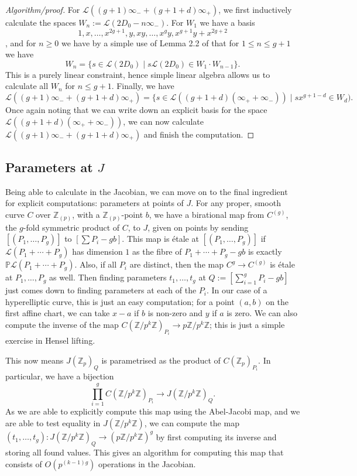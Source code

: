 \documentclass[12pt]{article}
\newcommand{\Z}{\mathbb{Z}}
\newcommand{\Lcal}{\mathcal{L}}
\renewcommand{\P}{\mathbb{P}}
\theoremstyle{plain}
\theoremstyle{definition}
\theoremstyle{remark}
\begin{document}
\begin{proof}[Algorithm/proof]
For $\Lcal((g+1)\infty_- + (g+1+d)\infty_+)$, we first inductively calculate the spaces $W_n := \Lcal(2D_0 - n\infty_-)$. For $W_1$ we have a basis \[1,x,\dots,x^{2g+1},y,xy,\dots,x^g y, x^{g+1}y+x^{2g+2}\], and for $n \geq 0$ we have by a simple use of Lemma 2.2 of \cite{makdisi04} that for $1 \leq n \leq g+1$ we have \[W_{n} = \{s \in \Lcal(2D_0) \mid s\Lcal(2D_0) \in W_1 \cdot W_{n-1}\}.\]
This is a purely linear constraint, hence simple linear algebra allows us to calculate all $W_n$ for $n \leq g+1$. Finally, we have
\[
\Lcal((g+1)\infty_- + (g+1+d)\infty_+) = \{ s \in \Lcal((g+1+d)(\infty_+ + \infty_-)) \mid sx^{g+1-d} \in W_d).
\] 
Once again noting that we can write down an explicit basis for the space $\Lcal((g+1+d)(\infty_+ + \infty_-))$, we can now calculate $\Lcal((g+1)\infty_- + (g+1+d)\infty_+)$ and finish the computation.
\end{proof}

\subsection{Parameters at \texorpdfstring{$J$}{J}}
\label{subs:paramj}
Being able to calculate in the Jacobian, we can move on to the final ingredient for explicit computations: parameters at points of $J$. For any proper, smooth curve $C$ over $\Z_{(p)}$, with a $\Z_{(p)}$-point $b$, we have a birational map from $C^{(g)}$, the $g$-fold symmetric product of $C$, to $J$, given on points by sending $[(P_1,\dots,P_g)]$ to $[\sum P_i - gb]$. This map is \'etale at $[(P_1,\dots,P_g)]$ if $\Lcal(P_1 + \cdots + P_g)$ has dimension $1$ as the fibre of $P_1 + \cdots + P_g -gb$ is exactly $\P \Lcal(P_1 + \cdots + P_g)$. Also, if all $P_i$ are distinct, then the map $C^g \to C^{(g)}$ is \'etale at $P_1,\dots,P_g$ as well. Then finding parameters $t_1,\dots,t_g$ at $Q := [\sum_{i=1}^g P_i - gb]$ just comes down to finding parameters at each of the $P_i$. In our case of a hyperelliptic curve, this is just an easy computation; for a point $(a,b)$ on the first affine chart, we can take $x-a$ if $b$ is non-zero and $y$ if $a$ is zero. We can also compute the inverse of the map $C(\Z/p^k\Z)_{P_i} \to p\Z/p^k\Z$; this is just a simple exercise in Hensel lifting.

This now means $J(\Z_p)_Q$ is parametrised as the product of $C(\Z_p)_{P_i}$. In particular, we have a bijection
\[
\prod_{i=1}^g C(\Z/p^k\Z)_{P_i} \to J(\Z/p^k\Z)_{Q}.
\] As we are able to explicitly compute this map using the Abel-Jacobi map, and we are able to test equality in $J(\Z/p^k\Z)$, we can compute the map $(t_1,\dots,t_g): J(\Z/p^k\Z)_Q \to (p\Z/p^{k}\Z)^g$ by first computing its inverse and storing all found values. This gives an algorithm for computing this map that consists of $O(p^{(k-1)g})$ operations in the Jacobian.
\end{document}
